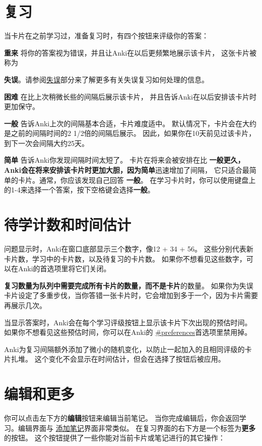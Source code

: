 \documentclass[a4paper]{book}
\begin{document}
	\section{复习}\label{reviewingahead}
	
	当卡片在之前学习过，准备复习时，有四个按钮来评级你的答案：
	
	\textbf{重来} 将你的答案视为错误，并且让Anki在以后更频繁地展示该卡片， 这张卡片被称为
	
	\textbf{失误}。请参阅\hyperref[lapses]{失误}部分来了解更多有关失误复习如何处理的信息。
	
	\textbf{困难} 在比上次稍微长些的间隔后展示该卡片， 并且告诉Anki在以后安排该卡片时更加保守。
	
	\textbf{一般} 告诉Anki上次的间隔基本合适，卡片难度适中。 默认情况下，卡片会在大约是之前的间隔时间的2 1/2倍的间隔后展示。 因此，如果你在10天前见过该卡片，到下一次会间隔大约25天。
	
	\textbf{简单} 告诉Anki你发现间隔时间太短了。 卡片在将来会被安排在比
	\textbf{一般更久，Anki会在将来安排该卡片时更加大胆，因为简单}迅速增加了间隔， 它只适合最简单的卡片。通常，你应该发现自己回答
	\textbf{一般}。
	在学习卡片时，你可以使用键盘上的1-4来选择一个答案，按下空格键会选择\textbf{一般}。
	
	\section{待学计数和时间估计}
	
	问题显示时，Anki在窗口底部显示三个数字，像12 + 34 + 56。 这些分别代表新卡片数，学习中的卡片数，以及待复习的卡片数。 如果你不想看见这些数字，可以在Anki的首选项里将它们关闭。
	
	
	
	\begin{shaded}
		\textbf{复习数量为队列中需要完成所有卡片的数量，而不是卡片}的数量。 如果你为失误卡片设定了多重步伐，当你答错一张卡片时，它会增加到多于一个，因为卡片需要再展示几次。
	\end{shaded}
	
	当显示答案时，Anki会在每个学习评级按钮上显示该卡片下次出现的预估时间。 如果你不想看见这些预估时间，你可以在Anki的
	\url{#preferences}首选项里禁用掉。
	
	
	\begin{shaded}
		Anki为复习间隔额外添加了微小的随机变化，以防止一起加入的且相同评级的卡片扎堆。 这个变化不会显示在时间估计，但会在选择了按钮后被应用。
	\end{shaded}
	
	\section{编辑和更多}\label{editmore}
	你可以点击左下方的\textbf{编辑}按钮来编辑当前笔记。 当你完成编辑后，你会返回学习。编辑界面与
	\hyperref[addingnotes]{添加笔记}界面非常类似。
	在复习界面的右下方是一个标签为\textbf{更多}的按钮。 这个按钮提供了一些你能对当前卡片或笔记进行的其它操作：
	
\end{document}
